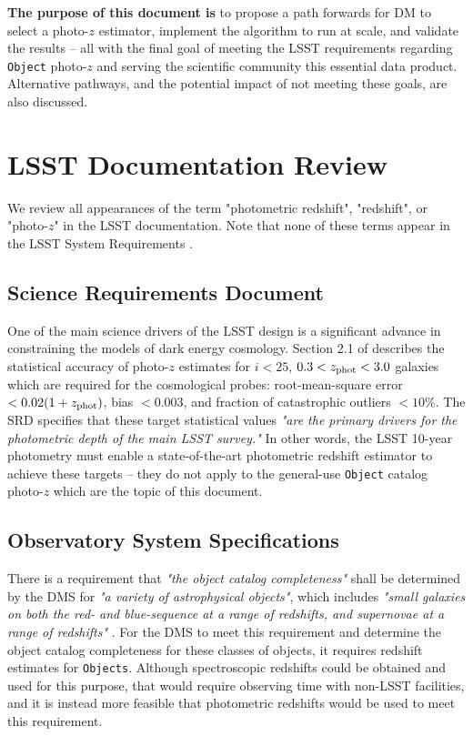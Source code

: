 \documentclass[DM,lsstdraft,toc]{lsstdoc}
\begin{document}
{\bf The purpose of this document is} to propose a path forwards for DM to select a photo-$z$ estimator, implement the algorithm to run at scale, and validate the results -- all with the final goal of meeting the LSST requirements regarding {\tt Object} photo-$z$ and serving the scientific community this essential data product. 
Alternative pathways, and the potential impact of not meeting these goals, are also discussed.




\clearpage
\section{LSST Documentation Review}\label{sec:docs}

We review all appearances of the term "photometric redshift", "redshift", or "photo-$z$" in the LSST documentation. Note that none of these terms appear in the LSST System Requirements .

\subsection{Science Requirements Document}\label{ssec:docs_srd}

One of the main science drivers of the LSST design is a significant advance in constraining the models of dark energy cosmology. 
Section 2.1 of  describes the statistical accuracy of photo-$z$ estimates for $i<25$, $0.3<z_{\rm phot}<3.0$ galaxies which are required for the cosmological probes: root-mean-square error $<0.02(1+z_{\rm phot})$, bias $<0.003$, and fraction of catastrophic outliers $<10\%$.
The SRD specifies that these target statistical values {\it "are the primary drivers for the photometric depth of the main LSST survey."} 
In other words, the LSST 10-year photometry must enable a state-of-the-art photometric redshift estimator to achieve these targets -- they do not apply to the general-use {\tt Object} catalog photo-$z$ which are the topic of this document.

\subsection{Observatory System Specifications}\label{ssec:docs_oss}

There is a requirement that {\it "the object catalog completeness"} shall be determined by the DMS for {\it "a variety of astrophysical objects"}, which includes {\it "small galaxies on both the red- and blue-sequence at a range of redshifts, and supernovae at a range of redshifts"} . 
For the DMS to meet this requirement and determine the object catalog completeness for these classes of objects, it requires redshift estimates for {\tt Objects}.
Although spectroscopic redshifts could be obtained and used for this purpose, that would require observing time with non-LSST facilities, and it is instead more feasible that photometric redshifts would be used to meet this requirement.
\end{document}
